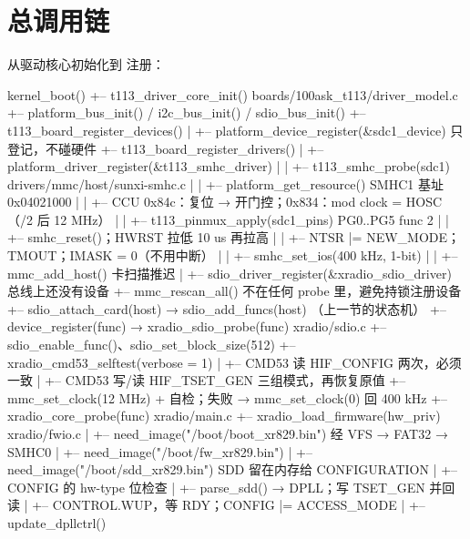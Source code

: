 \section{总调用链}

从驱动核心初始化到  注册：

\begin{txtcode}[basicstyle=\ttfamily\scriptsize]
kernel_boot()
+-- t113_driver_core_init()                          boards/100ask_t113/driver_model.c
    +-- platform_bus_init() / i2c_bus_init() / sdio_bus_init()
    +-- t113_board_register_devices()
    |   +-- platform_device_register(&sdc1_device)   只登记，不碰硬件
    +-- t113_board_register_drivers()
    |   +-- platform_driver_register(&t113_smhc_driver)
    |   |   +-- t113_smhc_probe(sdc1)                drivers/mmc/host/sunxi-smhc.c
    |   |       +-- platform_get_resource()          SMHC1 基址 0x04021000
    |   |       +-- CCU 0x84c：复位 → 开门控；0x834：mod clock = HOSC（/2 后 12 MHz）
    |   |       +-- t113_pinmux_apply(sdc1_pins)     PG0..PG5 func 2
    |   |       +-- smhc_reset()；HWRST 拉低 10 us 再拉高
    |   |       +-- NTSR |= NEW_MODE；TMOUT；IMASK = 0（不用中断）
    |   |       +-- smhc_set_ios(400 kHz, 1-bit)
    |   |       +-- mmc_add_host()                   卡扫描推迟
    |   +-- sdio_driver_register(&xradio_sdio_driver)    总线上还没有设备
    +-- mmc_rescan_all()                             不在任何 probe 里，避免持锁注册设备
        +-- sdio_attach_card(host) → sdio_add_funcs(host)   （上一节的状态机）
            +-- device_register(func) → xradio_sdio_probe(func)      xradio/sdio.c
                +-- sdio_enable_func()、sdio_set_block_size(512)
                +-- xradio_cmd53_selftest(verbose = 1)
                |   +-- CMD53 读 HIF_CONFIG 两次，必须一致
                |   +-- CMD53 写/读 HIF_TSET_GEN 三组模式，再恢复原值
                +-- mmc_set_clock(12 MHz) + 自检；失败 → mmc_set_clock(0) 回 400 kHz
                +-- xradio_core_probe(func)                          xradio/main.c
                    +-- xradio_load_firmware(hw_priv)                xradio/fwio.c
                    |   +-- need_image("/boot/boot_xr829.bin")       经 VFS → FAT32 → SMHC0
                    |   +-- need_image("/boot/fw_xr829.bin")
                    |   +-- need_image("/boot/sdd_xr829.bin")        SDD 留在内存给 CONFIGURATION
                    |   +-- CONFIG 的 hw-type 位检查
                    |   +-- parse_sdd() → DPLL；写 TSET_GEN 并回读
                    |   +-- CONTROL.WUP，等 RDY；CONFIG |= ACCESS_MODE
                    |   +-- update_dpllctrl()

\end{txtcode}
